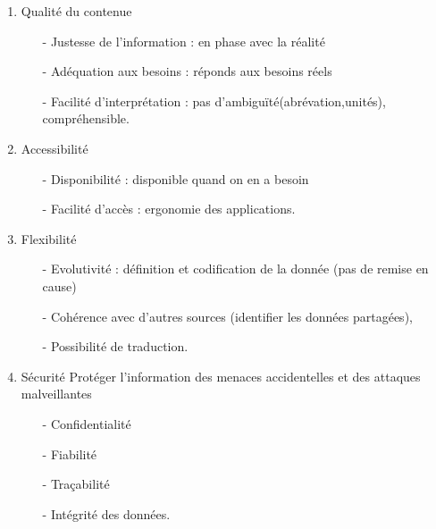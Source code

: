 \begin{enumerate}
\item {Qualité du contenue}
\begin{itemize}
\item[-]Justesse de l’information : en phase avec la réalité
\item[-]Adéquation aux besoins : réponds aux besoins réels
\item[-]Facilité d'interprétation : pas d'ambiguïté(abrévation,unités), compréhensible.
\end{itemize}
\item {Accessibilité}
\begin{itemize}
\item[-]Disponibilité : disponible quand on en a besoin
\item[-]Facilité d’accès : ergonomie des applications.
\end{itemize}
\item {Flexibilité}
\begin{itemize}
\item[-]Evolutivité : définition et codification de la donnée (pas de remise en cause) 
\item[-]Cohérence avec d’autres sources (identifier les données partagées), 
\item[-]Possibilité de traduction.
\end{itemize}
\item {Sécurité}
Protéger l’information des menaces accidentelles et des attaques malveillantes
\begin{itemize}
\item[-]Confidentialité 
\item[-]Fiabilité 
\item[-]Traçabilité
\item[-]Intégrité des données.
\end{itemize}
\end{enumerate}


